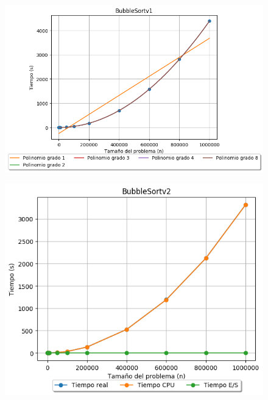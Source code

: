 \documentclass[12pt, fleqn]{report}                             %
\theoremstyle{break}                                            %
\begin{document}
    	        \begin{figure}[H]
    	            \centering
    	            \includegraphics[scale=0.78]{graphics/BubbleSortv1-Polynomials.png}
    	        \end{figure}
    	        
    	        \begin{figure}[H]
    	            \centering
    	            \includegraphics[scale=0.9]{graphics/BubbleSortv2-ExperimentalTimes.png}
    	        \end{figure}
    	        
\end{document}
